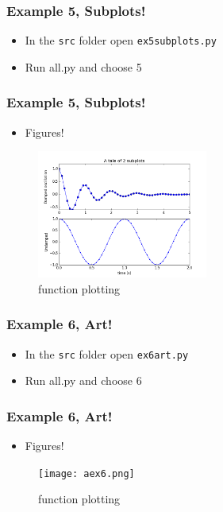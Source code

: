 \documentclass{beamer}
\begin{document}
\begin{frame}
\frametitle{Example 5, Subplots!}
\begin{itemize}
\item In the \texttt{src} folder open \texttt{ex5subplots.py} 
	\item Run all.py and choose 5 
\end{itemize}
\end{frame}

\begin{frame}
\frametitle{Example 5, Subplots!}
\begin{itemize}
\item Figures!
\end{itemize}
\begin{figure}
	\centering
	\includegraphics[width=0.5\textwidth]{ex5.png}
	\caption{function plotting}
	\label{fig:function}
\end{figure}
\end{frame}

\begin{frame}
\frametitle{Example 6, Art!}
\begin{itemize}
\item In the \texttt{src} folder open \texttt{ex6art.py} 
	\item Run all.py and choose 6 
\end{itemize}
\end{frame}

\begin{frame}
\frametitle{Example 6, Art!}
\begin{itemize}
\item Figures!
\end{itemize}
\begin{figure}
	\centering
	\texttt{[image: aex6.png]}
	\caption{function plotting}
	\label{fig:function}
\end{figure}
\end{frame}
\end{document}
